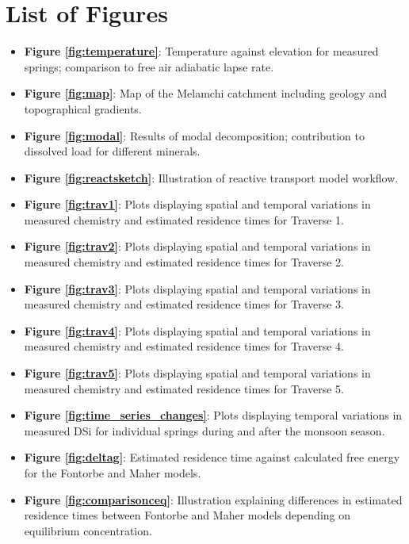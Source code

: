 \documentclass[hidelinks, 12pt]{article} %
\begin{document}
\section*{List of Figures}

{\normalsize

\begin{itemize}[wide]
  \setlength{\itemindent}{-0mm}  %

  \item[] \textbf{Figure \ref{fig:temperature}}: Temperature against elevation for measured springs; comparison to free air adiabatic lapse rate.
  \item[] \textbf{Figure \ref{fig:map}}: Map of the Melamchi catchment including geology and topographical gradients.
  \item[] \textbf{Figure \ref{fig:modal}}: Results of modal decomposition; contribution to dissolved load for different minerals.
  \item[] \textbf{Figure \ref{fig:reactsketch}}: Illustration of reactive transport model workflow.
  \item[] \textbf{Figure \ref{fig:trav1}}: Plots displaying spatial and temporal variations in measured chemistry and estimated residence times for Traverse 1.
  \item[] \textbf{Figure \ref{fig:trav2}}: Plots displaying spatial and temporal variations in measured chemistry and estimated residence times for Traverse 2.
  \item[] \textbf{Figure \ref{fig:trav3}}: Plots displaying spatial and temporal variations in measured chemistry and estimated residence times for Traverse 3.
  \item[] \textbf{Figure \ref{fig:trav4}}: Plots displaying spatial and temporal variations in measured chemistry and estimated residence times for Traverse 4.
  \item[] \textbf{Figure \ref{fig:trav5}}: Plots displaying spatial and temporal variations in measured chemistry and estimated residence times for Traverse 5.
  \item[] \textbf{Figure \ref{fig:time_series_changes}}: Plots displaying temporal variations in measured DSi for individual springs during and after the monsoon season.
  \item[] \textbf{Figure \ref{fig:deltag}}: Estimated residence time against calculated free energy for the Fontorbe and Maher models.
  \item[] \textbf{Figure \ref{fig:comparisonceq}}: Illustration explaining differences in estimated residence times between Fontorbe and Maher models depending on equilibrium concentration.

\end{itemize}

}
\end{document}
